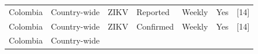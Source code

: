 \documentclass[10pt,letterpaper]{article}
\begin{document}
\begin{longtable}[]{@{}lllllll@{}}
\begin{minipage}[t]{0.03\columnwidth}
Colombia\strut
\end{minipage} & \begin{minipage}[t]{0.37\columnwidth}\raggedright\strut
Country-wide\strut
\end{minipage} & \begin{minipage}[t]{0.08\columnwidth}\raggedright\strut
ZIKV\strut
\end{minipage} & \begin{minipage}[t]{0.17\columnwidth}\raggedright\strut
Reported\strut
\end{minipage} & \begin{minipage}[t]{0.04\columnwidth}\raggedright\strut
Weekly\strut
\end{minipage} & \begin{minipage}[t]{0.04\columnwidth}\raggedright\strut
Yes\strut
\end{minipage} & \begin{minipage}[t]{0.08\columnwidth}\raggedright\strut
{[}14{]}\strut
\end{minipage}\tabularnewline
\begin{minipage}[t]{0.03\columnwidth}\raggedright\strut
Colombia\strut
\end{minipage} & \begin{minipage}[t]{0.37\columnwidth}\raggedright\strut
Country-wide\strut
\end{minipage} & \begin{minipage}[t]{0.08\columnwidth}\raggedright\strut
ZIKV\strut
\end{minipage} & \begin{minipage}[t]{0.17\columnwidth}\raggedright\strut
Confirmed\strut
\end{minipage} & \begin{minipage}[t]{0.04\columnwidth}\raggedright\strut
Weekly\strut
\end{minipage} & \begin{minipage}[t]{0.04\columnwidth}\raggedright\strut
Yes\strut
\end{minipage} & \begin{minipage}[t]{0.08\columnwidth}\raggedright\strut
{[}14{]}\strut
\end{minipage}\tabularnewline
\begin{minipage}[t]{0.03\columnwidth}\raggedright\strut
Colombia\strut
\end{minipage} & \begin{minipage}[t]{0.37\columnwidth}\raggedright\strut
Country-wide\strut
\end{minipage} & \begin{minipage}[t]{0.08\columnwidth}\raggedright\strut

\end{minipage}
\end{longtable}
\end{document}
